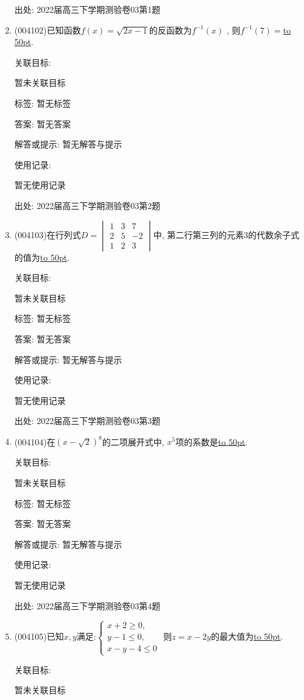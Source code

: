 \documentclass[10pt,a4paper]{article}
\newcommand{\blank}[1]{\underline{\hbox to #1pt{}}}
\begin{document}
\begin{enumerate}[1.]
出处: 2022届高三下学期测验卷03第1题
\item { (004102)}已知函数$f(x)=\sqrt{2x-1}$的反函数为$f^{-1}(x)$ , 则$f^{-1}(7)=$\blank{50}.


关联目标:

暂未关联目标



标签: 暂无标签

答案: 暂无答案

解答或提示: 暂无解答与提示

使用记录:

暂无使用记录


出处: 2022届高三下学期测验卷03第2题
\item { (004103)}在行列式$D=\begin{vmatrix}1&3&7\\2&5&-2\\1&2&3\end{vmatrix}$中, 第二行第三列的元素$3$的代数余子式的值为\blank{50}.


关联目标:

暂未关联目标



标签: 暂无标签

答案: 暂无答案

解答或提示: 暂无解答与提示

使用记录:

暂无使用记录


出处: 2022届高三下学期测验卷03第3题
\item { (004104)}在$(x-\sqrt 2)^8$的二项展开式中, $x^5$项的系数是\blank{50}.


关联目标:

暂未关联目标



标签: 暂无标签

答案: 暂无答案

解答或提示: 暂无解答与提示

使用记录:

暂无使用记录


出处: 2022届高三下学期测验卷03第4题
\item { (004105)}已知$x,y$满足:$\begin{cases}  x+2\ge 0,  \\y-1\le 0,  \\x-y-4\le 0  \end{cases}$ 则$z=x-2y$的最大值为\blank{50}.


关联目标:

暂未关联目标




\end{enumerate}
\end{document}
